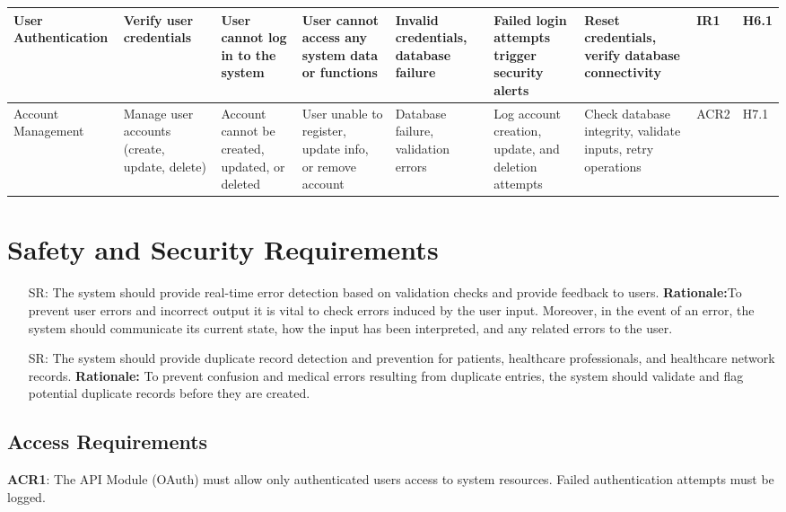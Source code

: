 \documentclass{article}
\newcounter{srnum} %
\begin{document}
\begin{landscape}
\begin{longtable}{|p{1.5cm}|p{2cm}|p{2.6cm}|p{2cm}|p{2cm}|p{2cm}|p{3.5cm}|p{1cm}|p{0.8cm}|}
        \midrule
        User Authentication & \raggedright Verify user credentials & \raggedright User cannot log in to the system & \raggedright User cannot access any system data or functions & \raggedright Invalid credentials, database failure & \raggedright Failed login attempts trigger security alerts & \raggedright Reset credentials, verify database connectivity & IR1 & H6.1 \\
        \midrule
        Account Management & \raggedright Manage user accounts (create, update, delete) & \raggedright Account cannot be created, updated, or deleted & \raggedright User unable to register, update info, or remove account & \raggedright Database failure, validation errors & \raggedright Log account creation, update, and deletion attempts & \raggedright Check database integrity, validate inputs, retry operations & ACR2 & H7.1 \\  
        \bottomrule
    \end{longtable}
\end{landscape}

\section{Safety and Security Requirements}


\begin{itemize}
    \item[SR\refstepcounter{srnum}\thesrnum \label{SR_ErrorDetection}:] The system should provide real-time error detection based on validation checks and provide feedback to users.
    \textbf{Rationale:}To prevent user errors and incorrect output it is vital to check errors induced by the user input. Moreover, in the event of an error, the system should communicate its current state, how the input has been interpreted, and any related errors to the user.
    
    \item [SR\refstepcounter{srnum}\thesrnum \label{SR_DuplicateRecordDetection}:] The system should provide duplicate record detection and prevention for patients, healthcare professionals, and healthcare network records.
    \textbf{Rationale:} To prevent confusion and medical errors resulting from duplicate entries, the system should validate and flag potential duplicate records before they are created.
\end{itemize}
\subsection{Access Requirements}
\textbf{ACR1}: The API Module (OAuth) must allow only authenticated users access to system resources. Failed authentication attempts must be logged.
\end{document}
